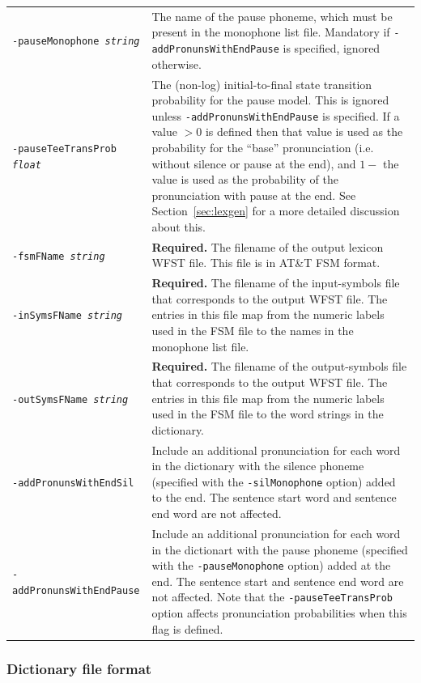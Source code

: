 \documentclass[a4paper,12pt]{report}
\begin{document}
\begin{center}
\begin{longtable}{lp{9cm}}
{\tt -pauseMonophone \emph{string}} & The name of the pause phoneme, which must be present in the monophone list file. Mandatory if {\tt -addPronunsWithEndPause} is specified, ignored otherwise. \\
{\tt -pauseTeeTransProb \emph{float}} & The (non-log) initial-to-final state transition probability for the pause model. This is ignored unless {\tt -addPronunsWithEndPause} is specified. If a value $>0$ is defined then that value is used as the probability for the ``base'' pronunciation (i.e. without silence or pause at the end), and $1-$ the value is used as the probability of the pronunciation with pause at the end. See Section~\ref{sec:lexgen} for a more detailed discussion about this. \\
{\tt -fsmFName \emph{string}} & {\bf Required.} The filename of the output lexicon WFST file. This file is in AT\&T FSM format. \\
{\tt -inSymsFName \emph{string}} & {\bf Required.} The filename of the input-symbols file that corresponds to the output WFST file. The entries in this file map from the numeric labels used in the FSM file to the names in the monophone list file. \\
{\tt -outSymsFName \emph{string}} & {\bf Required.} The filename of the output-symbols file that corresponds to the output WFST file. The entries in this file map from the numeric labels used in the FSM file to the word strings in the dictionary. \\
{\tt -addPronunsWithEndSil} & Include an additional pronunciation for each word in the dictionary with the silence phoneme (specified with the {\tt -silMonophone} option) added to the end. The sentence start word and sentence end word are not affected. \\
{\tt -addPronunsWithEndPause} & Include an additional pronunciation for each word in the dictionart with the pause phoneme (specified with the {\tt -pauseMonophone} option) added at the end. The sentence start and sentence end word are not affected. Note that the {\tt -pauseTeeTransProb} option affects pronunciation probabilities when this flag is defined. \\
\end{longtable}
\end{center}


\subsubsection{Dictionary file format}
\end{document}
